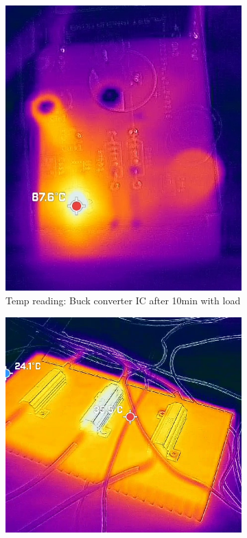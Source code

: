 \begin{figure}[H]
    \centering
    \hfill
    \begin{subfigure}{0.23\textwidth}
        \includegraphics[width=\linewidth]{afbeelding2.png}
        \caption{Temp reading: Buck converter IC after 10min with load}
        \label{fig:BuckTemp}
    \end{subfigure}
    \hfill
    \begin{subfigure}{0.3\textwidth}
        \includegraphics[width=\linewidth]{afbeelding.png}

\end{subfigure}
\end{figure}
